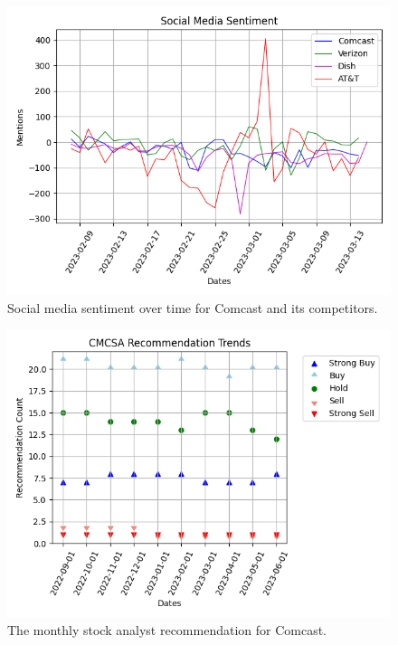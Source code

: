 \documentclass[conference]{IEEEtran}
\begin{document}
\begin{figure}
    \includegraphics[width=\columnwidth]{social_media_sentiment}
    \caption{Social media sentiment over time for Comcast and its competitors.}
\end{figure}

\begin{figure}
    \includegraphics[width=\columnwidth]{trends}
    \caption{The monthly stock analyst recommendation for Comcast.}
\end{figure}
\end{document}
